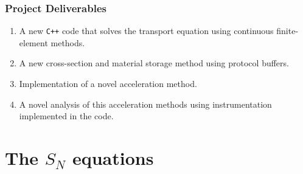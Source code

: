 \documentclass[xcolor=x11names, compress]{beamer}
\begin{document}
\begin{frame}
  \frametitle{Project Deliverables}

  \begin{enumerate}[<+->]
  \item A new \texttt{C++} code that solves the transport
    equation using continuous finite-element methods.
  \item A new cross-section and material storage method using protocol buffers.
  \item Implementation of a novel acceleration method.
  \item A novel analysis of this acceleration methods using
    instrumentation implemented in the code.
  \end{enumerate}
\end{frame}

\section{The $S_N$ equations}
\end{document}
